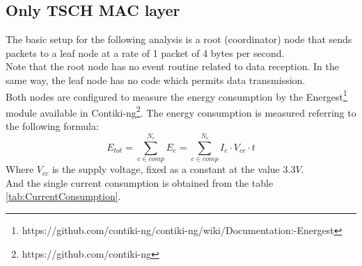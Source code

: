 \documentclass[conference]{IEEEtran}
\begin{document}
\subsection{Only TSCH MAC layer}
The basic setup for the following analysis is a root (coordinator) node that sends packets to a leaf node at a rate of 1 packet of 4 bytes per second.\\
Note that the root node has no event routine related to data reception. In the same way, the leaf node has no code which permits data transmission.\\
Both nodes are configured to measure the energy consumption by the Energest\footnote{https://github.com/contiki-ng/contiki-ng/wiki/Documentation:-Energest} module available in Contiki-ng\footnote{https://github.com/contiki-ng}.
The energy consumption is measured referring to the following formula:
\begin{equation}
	E_{tot}=\sum_{c \in comp}^{N_{c}}E_{c}=\sum_{c \in comp}^{N_{c}}I_c  \cdot V_{cc} \cdot t
\end{equation}
Where $V_{cc}$ is the supply voltage, fixed as a constant at the value $3.3V$.\\
And the single current consumption is obtained from the table \ref{tab:CurrentConsumption}\cite{inproceedings}.\\
\end{document}
